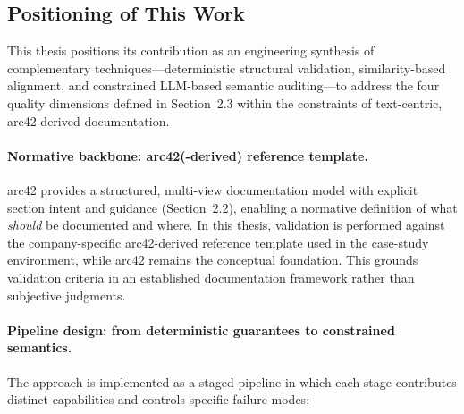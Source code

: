 \subsection{Positioning of This Work}
This thesis positions its contribution as an engineering synthesis of complementary techniques—deterministic structural validation, similarity-based alignment, and constrained LLM-based semantic auditing—to address the four quality dimensions defined in Section~2.3 within the constraints of text-centric, arc42-derived documentation.

\paragraph{Normative backbone: arc42(-derived) reference template.}
arc42 provides a structured, multi-view documentation model with explicit section intent and guidance (Section~2.2), enabling a normative definition of what \emph{should} be documented and where. In this thesis, validation is performed against the company-specific arc42-derived reference template used in the case-study environment, while arc42 remains the conceptual foundation. This grounds validation criteria in an established documentation framework rather than subjective judgments.

\paragraph{Pipeline design: from deterministic guarantees to constrained semantics.}
The approach is implemented as a staged pipeline in which each stage contributes distinct capabilities and controls specific failure modes:

